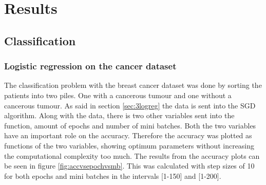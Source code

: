 \documentclass[../main.tex]{subfiles}
\begin{document}
\section{Results}
\subsection{Classification}
\subsubsection{Logistic regression on the cancer dataset}
The classification problem with the breast cancer dataset was done by sorting the patients into two piles. One with a cancerous tumour and one without a cancerous tumour. As said in section \ref{sec:3logreg} the data is sent into the SGD algorithm. Along with the data, there is two other variables sent into the function, amount of epochs and number of mini batches. Both the two variables have an important role on the accuracy. Therefore the accuracy was plotted as functions of the two variables, showing optimum parameters without increasing the computational complexity too much. The results from the accuracy plots can be seen in figure \ref{fig:accvsepochvsmb}. This was calculated with step sizes of 10 for both epochs and mini batches in the intervals [1-150] and [1-200].
\end{document}
